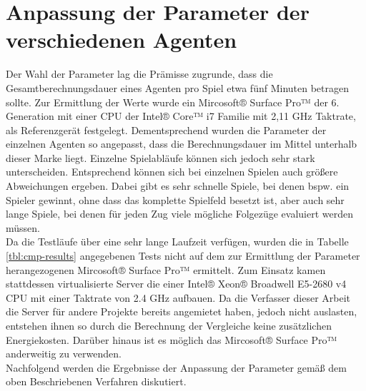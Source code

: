 \section{Anpassung der Parameter der verschiedenen Agenten}
Der Wahl der Parameter lag die Prämisse zugrunde, dass die Gesamtberechnungsdauer eines Agenten pro Spiel etwa fünf Minuten betragen sollte. Zur Ermittlung der Werte wurde ein  Mircosoft® Surface Pro™ der 6. Generation mit einer CPU der Intel® Core™ i7 Familie mit 2,11 GHz Taktrate, als Referenzgerät festgelegt. Dementsprechend wurden die Parameter der einzelnen Agenten so angepasst, dass die Berechnungsdauer im Mittel unterhalb dieser Marke liegt. Einzelne Spielabläufe können sich jedoch sehr stark unterscheiden. Entsprechend können sich bei einzelnen Spielen auch größere Abweichungen ergeben. Dabei gibt es sehr schnelle Spiele, bei denen bspw. ein Spieler gewinnt, ohne dass das komplette Spielfeld besetzt ist, aber auch sehr lange Spiele, bei denen für jeden Zug viele mögliche Folgezüge evaluiert werden müssen.
\\Da die Testläufe über eine sehr lange Laufzeit verfügen, wurden die in Tabelle \ref{tbl:cmp-results} angegebenen Tests nicht auf dem zur Ermittlung der Parameter herangezogenen Mircosoft® Surface Pro™ ermittelt. Zum Einsatz kamen stattdessen virtualisierte Server die einer Intel® Xeon® Broadwell E5-2680 v4 CPU mit einer Taktrate von 2.4 GHz aufbauen. Da die Verfasser dieser Arbeit die Server für andere Projekte bereits angemietet haben, jedoch nicht auslasten, entstehen ihnen so durch die Berechnung der Vergleiche keine zusätzlichen Energiekosten. Darüber hinaus ist es möglich das Mircosoft® Surface Pro™ anderweitig zu verwenden.
\\Nachfolgend werden die Ergebnisse der Anpassung der Parameter gemäß dem oben Beschriebenen Verfahren diskutiert.
